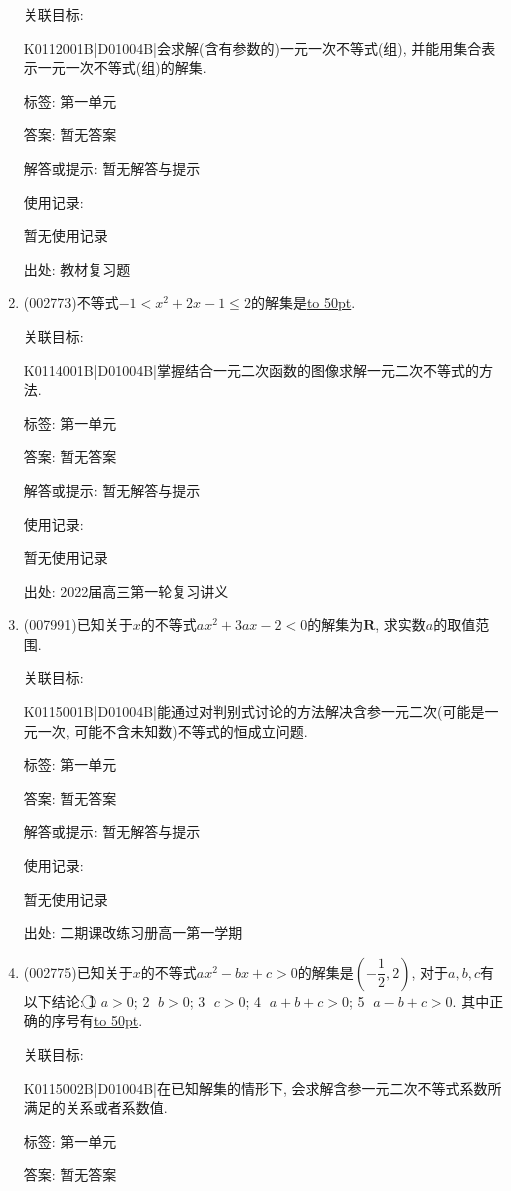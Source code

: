 \documentclass[10pt,a4paper]{article}
\newcommand{\blank}[1]{\underline{\hbox to #1pt{}}}
\begin{document}
\begin{enumerate}[1.]
关联目标:

K0112001B|D01004B|会求解(含有参数的)一元一次不等式(组), 并能用集合表示一元一次不等式(组)的解集.



标签: 第一单元

答案: 暂无答案

解答或提示: 暂无解答与提示

使用记录:

暂无使用记录


出处: 教材复习题
\item { (002773)}不等式$-1<x^2+2x-1\le 2$的解集是\blank{50}.


关联目标:

K0114001B|D01004B|掌握结合一元二次函数的图像求解一元二次不等式的方法.



标签: 第一单元

答案: 暂无答案

解答或提示: 暂无解答与提示

使用记录:

暂无使用记录


出处: 2022届高三第一轮复习讲义
\item { (007991)}已知关于$x$的不等式$ax^2+3ax-2<0$的解集为$\mathbf{R}$, 求实数$a$的取值范围.


关联目标:

K0115001B|D01004B|能通过对判别式讨论的方法解决含参一元二次(可能是一元一次, 可能不含未知数)不等式的恒成立问题.



标签: 第一单元

答案: 暂无答案

解答或提示: 暂无解答与提示

使用记录:

暂无使用记录


出处: 二期课改练习册高一第一学期
\item { (002775)}已知关于$x$的不等式$ax^2-bx+c>0$的解集是$(-\dfrac 12,2)$, 对于$a,b,c$有以下结论: \textcircled{1} $a>0$; \textcircled{2} $b>0$; \textcircled{3} $c>0$; \textcircled{4} $a+b+c>0$; \textcircled{5} $a-b+c>0$. 其中正确的序号有\blank{50}.


关联目标:

K0115002B|D01004B|在已知解集的情形下, 会求解含参一元二次不等式系数所满足的关系或者系数值.



标签: 第一单元

答案: 暂无答案


\end{enumerate}
\end{document}
